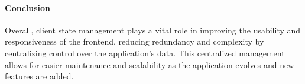     \paragraph{Conclusion}
    Overall, client state management plays a vital role in improving the usability and responsiveness of the frontend, reducing redundancy and complexity by centralizing control over the application’s data. This centralized management allows for easier maintenance and scalability as the application evolves and new features are added.
